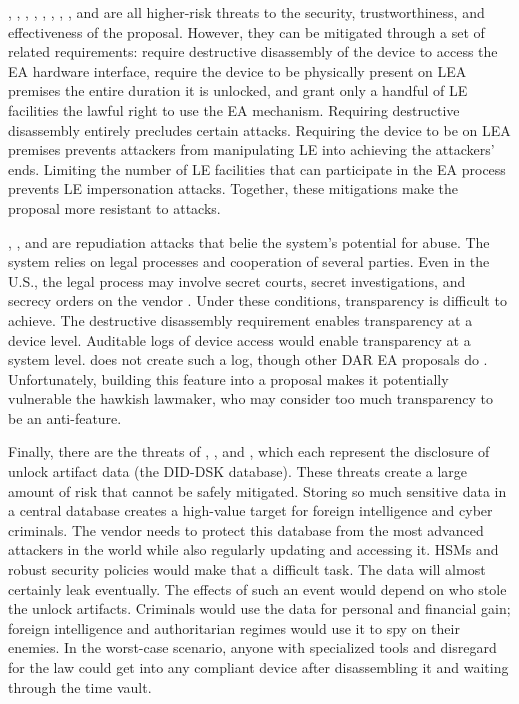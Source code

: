, , , , , , , , and  are all higher-risk threats to the
security, trustworthiness, and effectiveness of the proposal. However, they can be mitigated through a set of related
requirements: require destructive disassembly of the device to access the \ac{EA} hardware interface, require the device
to be physically present on LEA premises the entire duration it is unlocked, and grant only a handful of LE facilities
the lawful right to use the \ac{EA} mechanism. Requiring destructive disassembly entirely precludes certain attacks.
Requiring the device to be on LEA premises prevents attackers from manipulating LE into achieving the attackers' ends.
Limiting the number of LE facilities that can participate in the \ac{EA} process prevents LE impersonation attacks.
Together, these mitigations make the proposal more resistant to attacks.

, , and  are repudiation attacks that belie the system's potential for abuse. The system relies on
legal processes and cooperation of several parties. Even in the U.S., the legal process may involve secret courts,
secret investigations, and secrecy orders on the vendor \cite{shamsi_2011}. Under these conditions, transparency is
difficult to achieve. The destructive disassembly requirement enables transparency at a device level. Auditable logs of
device access  would enable transparency at a system level. \ldawmsr does not create such a
log, though other \ac{DAR} \ac{EA} proposals do \cite{phan_key_2017} \cite{servan_schreiber_jje_2020}
\cite{goldwasser_public_2017}. Unfortunately, building this feature into a proposal makes it potentially vulnerable the
hawkish lawmaker, who may consider too much transparency to be an anti-feature.

Finally, there are the threats of , , and , which each represent the disclosure of unlock artifact
data (the DID-DSK database). These threats create a large amount of risk that cannot be safely mitigated. Storing so
much sensitive data in a central database creates a high-value target for foreign intelligence and cyber criminals. The
vendor needs to protect this database from the most advanced attackers in the world while also regularly updating and
accessing it. \Acp{HSM} and robust security policies would make that a difficult task. The data will almost certainly
leak eventually. The effects of such an event would depend on who stole the unlock artifacts. Criminals would use the
data for personal and financial gain; foreign intelligence and authoritarian regimes would use it to spy on their
enemies. In the worst-case scenario, anyone with specialized tools and disregard for the law could get into any
compliant device after disassembling it and waiting through the time vault.


